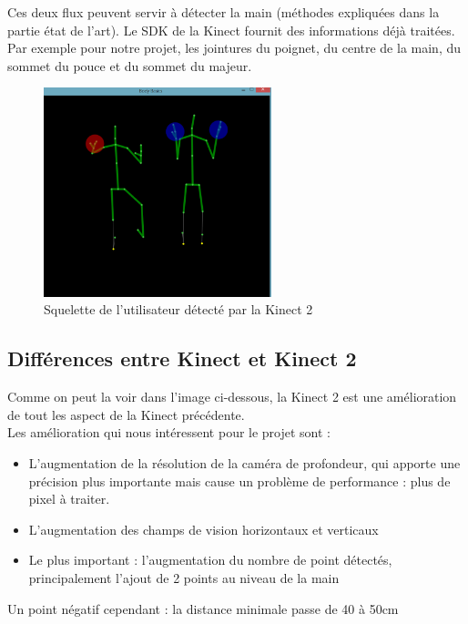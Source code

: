 Ces deux flux peuvent servir à détecter la main (méthodes expliquées dans la partie état de l'art).
Le SDK de la Kinect fournit des informations déjà traitées. 
Par exemple pour notre projet, les jointures du poignet, du centre de la main, du sommet du pouce et du sommet du majeur.

\begin{figure}[H]
\center
\includegraphics[width=250px]{images/kinec2_skel.png}
\caption{Squelette de l'utilisateur détecté par la Kinect 2}
\label{fig:skeleton_kinect2}
\end{figure}

\subsection{Différences entre Kinect et Kinect 2}

Comme on peut la voir dans l'image ci-dessous, la Kinect 2 est une amélioration de tout les aspect de la Kinect précédente.\\

Les amélioration qui nous intéressent pour le projet sont : 
\begin{itemize}
 \item L'augmentation de la résolution de la caméra de profondeur, qui apporte une précision plus importante mais cause un problème de performance : plus de pixel à traiter.
 \item L'augmentation des champs de vision horizontaux et verticaux
 \item Le plus important : l'augmentation du nombre de point détectés, principalement l'ajout de 2 points au niveau de la main
\end{itemize}

Un point négatif cependant : la distance minimale passe de 40 à 50cm 


